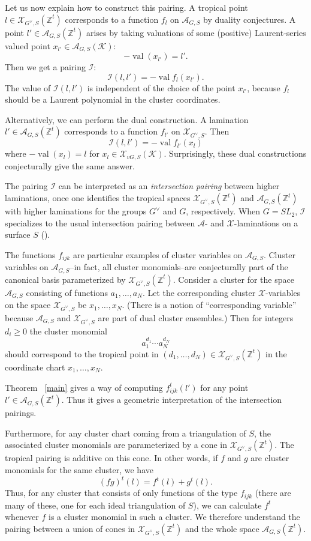 \documentclass[10pt]{amsart}
\theoremstyle{definition}
\newcommand{\Zt}{\mathbb{Z}^t}
\newcommand{\A}{\mathcal{A}}
\newcommand{\X}{\mathcal{X}}
\newcommand{\vG}{G^\vee}
\newcommand{\cK}{\mathcal{K}}
\newcommand{\val}{\operatorname{val}}
\begin{document}
Let us now explain how to construct this pairing. A tropical point $l \in \X_{\vG,S}(\Zt)$ corresponds to a function $f_l$ on $\A_{G,S}$ by duality conjectures. A point $l' \in \A_{G,S}(\Zt)$ arises by taking valuations of some (positive) Laurent-series valued point $x_{l'} \in \A_{G,S}(\cK)$:
\[
-\val(x_{l'}) = l'.
\]
Then we get a pairing $\mathcal{I}$:
\[
\mathcal{I}(l,l')=-\val f_l(x_{l'}).
\]
The value of $\mathcal{I}(l,l')$ is independent of the choice of the point $x_{l'}$, because $f_l$ should be a Laurent polynomial in the cluster coordinates.

Alternatively, we can perform the dual construction. A lamination $l' \in \A_{G,S}(\Zt)$ corresponds to a function $f_{l'}$ on $\X_{\vG,S}$. Then 
\[
\mathcal{I}(l,l')=-\val f_{l'}(x_{l})
\]
where $-\val(x_{l}) = l$ for $x_{l} \in \X_{vG,S}(\cK)$. Surprisingly, these dual constructions conjecturally give the same answer.

The pairing $\mathcal{I}$ can be interpreted as an \emph{intersection pairing} between higher laminations, once one identifies the tropical spaces $\X_{\vG,S}(\Zt)$ and $\A_{G,S}(\Zt)$ with higher laminations for the groups $\vG$ and $G$, respectively. When $G=SL_2$, $\mathcal{I}$ specializes to the usual intersection pairing between $\A$- and $\X$-laminations on a surface $S$ (\cite{FG1}).

The functions $f_{ijk}$ are particular examples of cluster variables on $\A_{G,S}$. Cluster variables on $\A_{G,S}$--in fact, all cluster monomials--are conjecturally part of the canonical basis parameterized by $\X_{\vG,S}(\Zt)$. Consider a cluster for the space $\A_{G,S}$ consisting of functions $a_1, \dots, a_N$. Let the corresponding cluster $\X$-variables on the space $\X_{\vG,S}$ be $x_1, \dots, x_N$. (There is a notion of ``corresponding variable'' because $\A_{G,S}$ and $\X_{\vG,S}$ are part of dual cluster ensembles.) Then for integers $d_i \geq 0$ the cluster monomial 
\[
a_1^{d_1} \cdots a_N^{d_N}
\]
should correspond to the tropical point in $(d_1, \dots, d_N) \in \X_{\vG,S}(\Zt)$ in the coordinate chart $x_1, \dots, x_N$.

Theorem ~\ref{main} gives a way of computing $f^t_{ijk}(l')$ for any point $l' \in \A_{G,S}(\Zt)$. Thus it gives a geometric interpretation of the intersection pairings. 

Furthermore, for any cluster chart coming from a triangulation of $S$, the associated cluster monomials are parameterized by a cone in $\X_{\vG,S}(\Zt)$. The tropical pairing is additive on this cone. In other words, if $f$ and $g$ are cluster monomials for the same cluster, we have
\[
(fg)^t(l) = f^t(l)+g^t(l).
\]
Thus, for any cluster that consists of only functions of the type $f_{ijk}$ (there are many of these, one for each ideal triangulation of $S$), we can calculate $f^t$ whenever $f$ is a cluster monomial in such a cluster. We therefore understand the pairing between a union of cones in $\X_{\vG,S}(\Zt)$ and the whole space $\A_{G,S}(\Zt)$.
\end{document}
